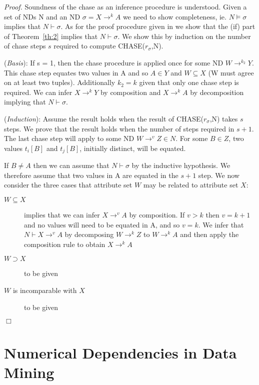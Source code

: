 {\em Proof.} Soundness of the chase as an inference procedure is
understood. Given a set of NDs N and an ND $\sigma = X \to^k A$ we
need to show completeness, ie. $N \models \sigma$ implies that $N
\vdash \sigma$. As for the proof procedure given in \cite{ll97c} we show
that the (if) part of Theorem~\ref{th:2} implies that $N \vdash
\sigma$. We show this by induction on the number of chase steps $s$
required to compute CHASE($r_\sigma$,N).

\smallskip
({\em Basis}):
If s = 1, then the chase procedure is applied once for some ND $W
\to^{k_2} Y$. This chase step equates two values in A and so $A \in Y$
 and $W \subseteq X$ (W must agree
on at least two tuples). Additionally $k_2 = k$ given that only one
chase step is required. We can infer $X \to^k Y$ by composition and $X
\to^k A$ by decomposition implying that $N \vdash \sigma$.
 
\smallskip
 
({\em Induction}):
Assume the result holds when the result of CHASE($r_\sigma$,N) takes 
$s$ steps. We prove that the result holds when the number of steps
required in $s+1$. The last chase step will apply to some ND $W \to^v Z
\in N$. For some $B \in Z$, two values $t_i[B]$ and $t_j[B]$,
initially distinct, will be equated.

\smallskip
If $B \not= A$ then we can assume that $N \vdash \sigma$ by the
 inductive hypothesis. We therefore assume that two values in A are
 equated in the $s+1$ step. We now consider the three cases that
 attribute set $W$
 may be related to attribute set $X$: \\

\begin{description}
\item[$W \subseteq X$] implies that we can infer $X \to^v A$ by
 composition. If $v > k$ then $v = k+1$ and no values will need to be
 equated in A, and so $v = k$. We infer that $N \vdash X \to^v A$ by
 decomposing $W \to^k Z$ to $W \to^k A$ and then apply the composition
 rule to obtain $X \to^k A$
\item[$W \supset X$] to be given
\item[$W$ is incomparable with $X$] to be given
\end{description} 
 $\Box$




\section{Numerical Dependencies in Data Mining}\label{sec:nd_datamine}

